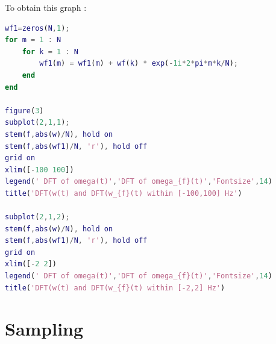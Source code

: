 \documentclass[a4paper,12pt]{article}
\begin{document}
\begin{enumerate}[label={\color{blue}\arabic*)}]
    \newpage
    To obtain this graph :

    \begin{lstlisting}[style=Matlab-editor,language=Matlab, basicstyle=\small\ttfamily]
wf1=zeros(N,1);
for m = 1 : N
    for k = 1 : N
        wf1(m) = wf1(m) + wf(k) * exp(-1i*2*pi*m*k/N);
    end
end

figure(3)
subplot(2,1,1);
stem(f,abs(w)/N), hold on
stem(f,abs(wf1)/N, 'r'), hold off
grid on
xlim([-100 100])
legend(' DFT of omega(t)','DFT of omega_{f}(t)','Fontsize',14)
title('DFT(w(t) and DFT(w_{f}(t) within [-100,100] Hz')

subplot(2,1,2);
stem(f,abs(w)/N), hold on
stem(f,abs(wf1)/N, 'r'), hold off
grid on
xlim([-2 2])
legend(' DFT of omega(t)','DFT of omega_{f}(t)','Fontsize',14)
title('DFT(w(t) and DFT(w_{f}(t) within [-2,2] Hz')
    \end{lstlisting}
        
\end{enumerate}

\newpage
\section{Sampling}
\end{document}
